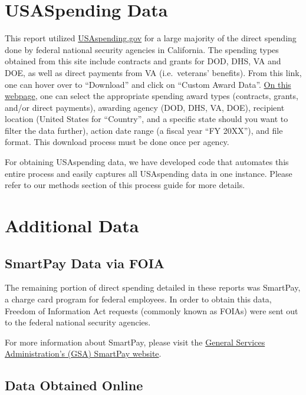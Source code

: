 \documentclass[
]{book}
\begin{document}
\hypertarget{usaspending-data}{%
\section{USASpending Data}\label{usaspending-data}}

This report utilized \href{https://www.usaspending.gov/}{USAspending.gov} for a large majority of the direct spending done by federal national security agencies in California. The spending types obtained from this site include contracts and grants for DOD, DHS, VA and DOE, as well as direct payments from VA (i.e.~veterans' benefits). From this link, one can hover over to ``Download'' and click on ``Custom Award Data''. \href{https://www.usaspending.gov/download_center/custom_award_data}{On this webpage}, one can select the appropriate spending award types (contracts, grants, and/or direct payments), awarding agency (DOD, DHS, VA, DOE), recipient location (United States for ``Country'', and a specific state should you want to filter the data further), action date range (a fiscal year ``FY 20XX''), and file format. This download process must be done once per agency.

For obtaining USAspending data, we have developed code that automates this entire process and easily captures all USAspending data in one instance. Please refer to our methods section of this process guide for more details.

\hypertarget{additional-data}{%
\section{Additional Data}\label{additional-data}}

\hypertarget{smartpay-data-via-foia}{%
\subsection{SmartPay Data via FOIA}\label{smartpay-data-via-foia}}

The remaining portion of direct spending detailed in these reports was SmartPay, a charge card program for federal employees. In order to obtain this data, Freedom of Information Act requests (commonly known as FOIAs) were sent out to the federal national security agencies.

For more information about SmartPay, please visit the \href{https://www.gsa.gov/travel/plan-book/gsa-smartpay}{General Services Administration's (GSA) SmartPay website}.

\hypertarget{data-obtained-online}{%
\subsection{Data Obtained Online}\label{data-obtained-online}}
\end{document}

